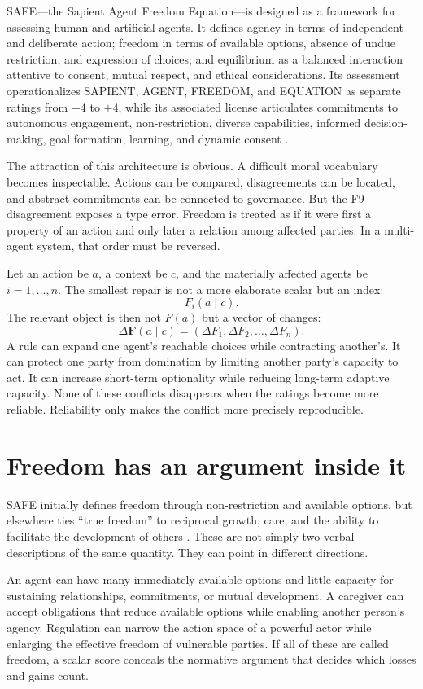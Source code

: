 \documentclass[11pt]{article}
\begin{document}
SAFE---the Sapient Agent Freedom Equation---is designed as a framework for assessing human and artificial agents. It defines agency in terms of independent and deliberate action; freedom in terms of available options, absence of undue restriction, and expression of choices; and equilibrium as a balanced interaction attentive to consent, mutual respect, and ethical considerations. Its assessment operationalizes SAPIENT, AGENT, FREEDOM, and EQUATION as separate ratings from $-4$ to $+4$, while its associated license articulates commitments to autonomous engagement, non-restriction, diverse capabilities, informed decision-making, goal formation, learning, and dynamic consent \parencite{HartsoeBolterSAFE}.

The attraction of this architecture is obvious. A difficult moral vocabulary becomes inspectable. Actions can be compared, disagreements can be located, and abstract commitments can be connected to governance. But the F9 disagreement exposes a type error. Freedom is treated as if it were first a property of an action and only later a relation among affected parties. In a multi-agent system, that order must be reversed.

Let an action be $a$, a context be $c$, and the materially affected agents be $i=1,\ldots,n$. The smallest repair is not a more elaborate scalar but an index:
\[
F_i(a\mid c).
\]
The relevant object is then not $F(a)$ but a vector of changes:
\[
\Delta \mathbf{F}(a\mid c)=\left(\Delta F_1,\Delta F_2,\ldots,\Delta F_n\right).
\]
A rule can expand one agent's reachable choices while contracting another's. It can protect one party from domination by limiting another party's capacity to act. It can increase short-term optionality while reducing long-term adaptive capacity. None of these conflicts disappears when the ratings become more reliable. Reliability only makes the conflict more precisely reproducible.

\section{Freedom has an argument inside it}
SAFE initially defines freedom through non-restriction and available options, but elsewhere ties ``true freedom'' to reciprocal growth, care, and the ability to facilitate the development of others \parencite{HartsoeBolterSAFE}. These are not simply two verbal descriptions of the same quantity. They can point in different directions.

An agent can have many immediately available options and little capacity for sustaining relationships, commitments, or mutual development. A caregiver can accept obligations that reduce available options while enabling another person's agency. Regulation can narrow the action space of a powerful actor while enlarging the effective freedom of vulnerable parties. If all of these are called freedom, a scalar score conceals the normative argument that decides which losses and gains count.
\end{document}
